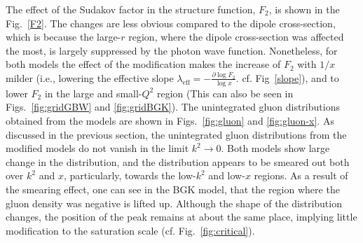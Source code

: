\documentclass[11pt]{article}
\begin{document}
The effect of the Sudakov factor in the structure function, $F_2$, is shown in the Fig.~\ref{F2}. The changes are less obvious compared to the dipole cross-section, which is because the large-$r$ region, where the dipole cross-section was affected the most, is largely suppressed by the photon wave function.  Nonetheless, for both models the effect of the modification makes the increase of $F_2$ with $1/x$ milder (i.e., lowering the effective slope $\lambda_\mathrm{eff}=-\frac{\partial \log F_2}{\log x}$. cf. Fig~\ref{slope}), %
and to lower $F_2$ in the large and small-$Q^2$ region (This can also be seen in Figs.~\ref{fig:gridGBW} and \ref{fig:gridBGK}). 
The unintegrated gluon distributions obtained from the models are shown in Figs.~\ref{fig:gluon} and \ref{fig:gluon-x}. As discussed in the previous section, the unintegrated gluon distributions from the modified models do not vanish in the limit $k^2\rightarrow0$. Both models show large change in the distribution, and the distribution appears to be smeared out both over $k^2$ and $x$, particularly, towards the low-$k^2$ and low-$x$ regions. As a result of the smearing effect, one can see in the BGK model, that the region where the gluon density was negative is lifted up.   
Although the shape of the distribution changes, the position of the peak remains at about the same place, implying little modification to the saturation scale (cf. Fig.~\ref{fig:critical}). 
\end{document}
